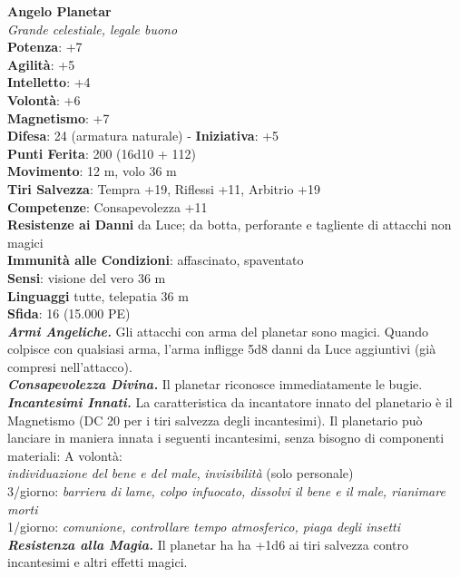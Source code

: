\begin{multicols}{2}
\medskip\textbf{Angelo Planetar}\\
\emph{Grande celestiale, legale buono}\\
\textbf{Potenza}: +7\\
\textbf{Agilità}: +5\\
\textbf{Intelletto}: +4\\
\textbf{Volontà}: +6\\
\textbf{Magnetismo}: +7\\
\textbf{Difesa}: 24 (armatura naturale) - \textbf{Iniziativa}: +5\\
\textbf{Punti Ferita}: 200 (16d10 + 112)\\
\textbf{Movimento}: 12 m, volo 36 m\\
\textbf{Tiri Salvezza}: Tempra +19, Riflessi +11, Arbitrio +19\\
\textbf{Competenze}: Consapevolezza +11\\
\textbf{Resistenze ai Danni} da Luce; da botta, perforante e tagliente di attacchi non magici\\
\textbf{Immunità alle Condizioni}: affascinato, spaventato\\
\textbf{Sensi}: visione del vero 36 m\\
\textbf{Linguaggi} tutte, telepatia 36 m\\
\textbf{Sfida}: 16 (15.000 PE)\smallskip\\
\emph{\textbf{Armi Angeliche.}} Gli attacchi con arma del planetar sono magici. Quando colpisce con qualsiasi arma, l'arma infligge 5d8 danni da Luce aggiuntivi (già compresi nell'attacco).\\
\emph{\textbf{Consapevolezza Divina.}} Il planetar riconosce immediatamente le bugie.\\
\emph{\textbf{Incantesimi Innati.}} La caratteristica da incantatore innato del planetario è il Magnetismo (DC 20 per i tiri salvezza degli incantesimi). Il planetario può lanciare in maniera innata i seguenti incantesimi, senza bisogno di componenti materiali: A volontà:\\
\emph{individuazione del bene e del male}, \emph{invisibilità} (solo personale)\\
3/giorno: \emph{barriera di lame, colpo infuocato, dissolvi il bene e il} \emph{male, rianimare morti}\\
1/giorno: \emph{comunione, controllare tempo atmosferico, piaga degli insetti}\\
\emph{\textbf{Resistenza alla Magia.}} Il planetar ha ha +1d6 ai tiri salvezza contro incantesimi e altri effetti magici.\\

\end{multicols}
